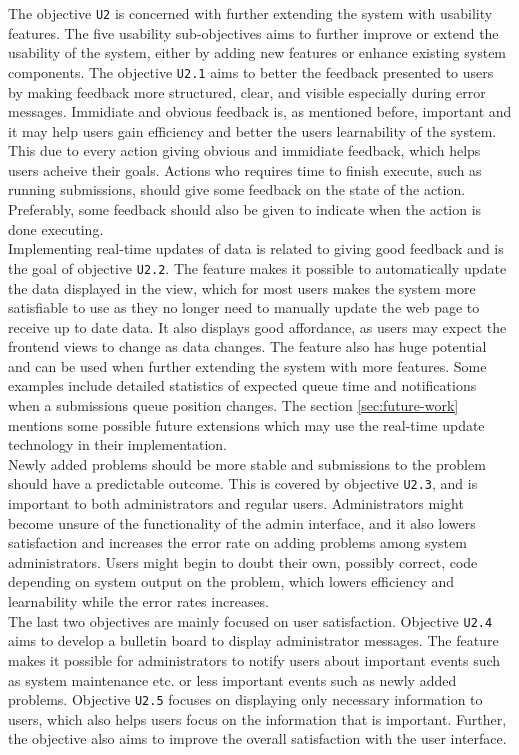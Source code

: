 The objective \texttt{U2} is concerned with further extending the system with usability features. The five usability sub-objectives aims to further improve or extend the usability of the system, either by adding new features or enhance existing system components. The objective \texttt{U2.1} aims to better the feedback presented to users by making feedback more structured, clear, and visible especially during error messages. Immidiate and obvious feedback is, as mentioned before, important and it may help users gain efficiency and better the users learnability of the system. This due to every action giving obvious and immidiate feedback, which helps users acheive their goals. Actions who requires time to finish execute, such as running submissions, should give some feedback on the state of the action. Preferably, some feedback should also be given to indicate when the action is done executing. \\

Implementing real-time updates of data is related to giving good feedback and is the goal of objective \texttt{U2.2}. The feature makes it possible to automatically update the data displayed in the view, which for most users makes the system more satisfiable to use as they no longer need to manually update the web page to receive up to date data. It also displays good affordance, as users may expect the frontend views to change as data changes. The feature also has huge potential and can be used when further extending the system with more features. Some examples include detailed statistics of expected queue time and notifications when a submissions queue position changes. The section \ref{sec:future-work} mentions some possible future extensions which may use the real-time update technology in their implementation. \\

Newly added problems should be more stable and submissions to the problem should have a predictable outcome. This is covered by objective \texttt{U2.3}, and is important to both administrators and regular users. Administrators might become unsure of the functionality of the admin interface, and it also lowers satisfaction and increases the error rate on adding problems among system administrators. Users might begin to doubt their own, possibly correct, code depending on system output on the problem, which lowers efficiency and learnability while the error rates increases. \\

The last two objectives are mainly focused on user satisfaction. Objective \texttt{U2.4} aims to develop a bulletin board to display administrator messages. The feature makes it possible for administrators to notify users about important events such as system maintenance etc. or less important events such as newly added problems. Objective \texttt{U2.5} focuses on displaying only necessary information to users, which also helps users focus on the information that is important. Further, the objective also aims to improve the overall satisfaction with the user interface.
